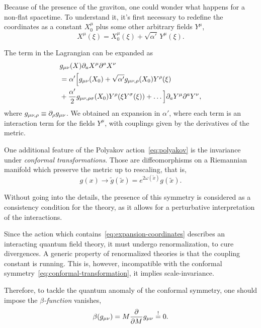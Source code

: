 Because of the presence of the graviton, one could wonder what happens for a non-flat spacetime. To understand it, it's first necessary to redefine the coordinates as a constant $X^\mu_0$ plus some other arbitrary fields $Y^\mu$,
\begin{equation}
    X^\mu (\xi) = X^\mu_0 (\xi) + \sqrt{\alpha'} \, Y^\mu (\xi).
\end{equation}

The term in the Lagrangian can be expanded as
\begin{equation}\label{eq:expansion-coordinates}
\begin{split}
    &g_{\mu\nu}(X) \partial_a X^\mu \partial^a X^\nu \\
    &= \alpha' \Bigl[ g_{\mu\nu}(X_0) + \sqrt{\alpha'} g_{\mu\nu,\rho}(X_0)Y^\rho(\xi) \\ &+ \frac{\alpha'}{2} g_{\mu\nu,\rho\sigma}(X_0)Y^\rho(\xi Y^\sigma(\xi)) + \dots \Bigr] \partial_a Y^\mu \partial^a Y^\nu ,
\end{split}
\end{equation}
where $g_{\mu\nu,\rho} \equiv \partial_\rho g_{\mu\nu}$. We obtained an expansion in $\alpha'$, where each term is an interaction term for the fields $Y^\mu$, with couplings given by the derivatives of the metric. 

One additional feature of the Polyakov action~\eqref{eq:polyakov} is the invariance under \emph{conformal transformations}. Those are diffeomorphisms on a Riemannian manifold which preserve the metric up to rescaling, that is,
\begin{equation}\label{eq:conformal-transformation}
    g(x) \to \tilde{g}(\tilde{x}) = e^{2\omega(\tilde{x})} g(\tilde{x}).
\end{equation}

Without going into the details, the presence of this symmetry is considered as a consistency condition for the theory, as it allows for a perturbative interpretation of the interactions. 

Since the action which contains~\eqref{eq:expansion-coordinates} describes an interacting quantum field theory, it must undergo renormalization, to cure divergences. A generic property of renormalized theories is that the coupling constant is running. This is, however, incompatible with the conformal symmetry~\eqref{eq:conformal-transformation}, it implies scale-invariance.

Therefore, to tackle the quantum anomaly of the conformal symmetry, one should impose the \emph{$\beta$-function} vanishes,
\begin{equation}
    \beta(g_{\mu\nu}) = M \frac{\partial}{\partial M} g_{\mu\nu} \overset{!}{=} 0.
\end{equation}

